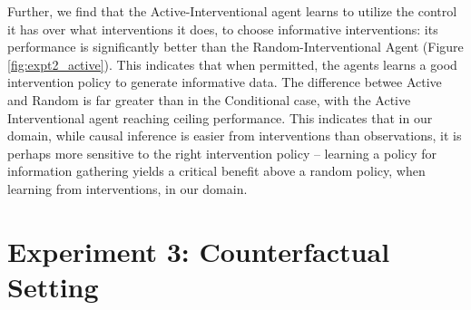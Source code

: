 
Further, we find that the Active-Interventional agent learns to utilize the control it has over what interventions it does, to choose informative interventions: its performance is significantly better than the Random-Interventional Agent (Figure \ref{fig:expt2_active}). This indicates that when permitted, the agents learns a good intervention policy to generate informative data. The difference betwee Active and Random is far greater than in the Conditional case, with the Active Interventional agent reaching ceiling performance. This indicates that in our domain, while causal inference is easier from interventions than observations, it is perhaps more sensitive to the right intervention policy -- learning a policy for information gathering yields a critical benefit above a random policy, when learning from interventions, in our domain.



\section{Experiment 3: Counterfactual Setting}
\label{sec:expt3}

